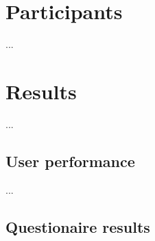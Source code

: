 \section{Participants}
...


\section{Results}
...

\subsection{User performance}
...

\subsection{Questionaire results}













